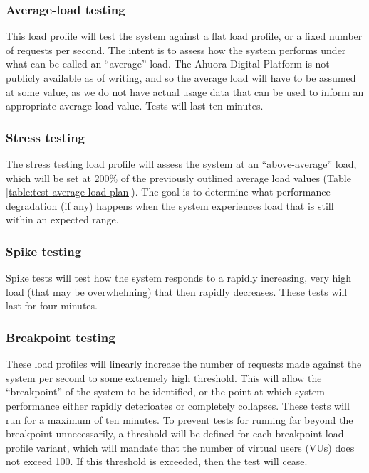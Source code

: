 \subsubsection{Average-load testing}

This load profile will test the system against a flat load profile, or a fixed number of requests per second. The intent is to assess how the system performs under what can be called an ``average'' load. The Ahuora Digital Platform is not publicly available as of writing, and so the average load will have to be assumed at some value, as we do not have actual usage data that can be used to inform an appropriate average load value. Tests will last ten minutes.

\subsubsection{Stress testing}

The stress testing load profile will assess the system at an ``above-average'' load, which will be set at 200\% of the previously outlined average load values (Table \ref{table:test-average-load-plan}). The goal is to determine what performance degradation (if any) happens when the system experiences load that is still within an expected range.

\subsubsection{Spike testing}

Spike tests will test how the system responds to a rapidly increasing, very high load (that may be overwhelming) that then rapidly decreases. These tests will last for four minutes.

\subsubsection{Breakpoint testing}

These load profiles will linearly increase the number of requests made against the system per second to some extremely high threshold. This will allow the ``breakpoint'' of the system to be identified, or the point at which system performance either rapidly deterioates or completely collapses. These tests will run for a maximum of ten minutes. To prevent tests for running far beyond the breakpoint unnecessarily, a threshold will be defined for each breakpoint load profile variant, which will mandate that the number of virtual users (VUs) does not exceed 100. If this threshold is exceeded, then the test will cease.


